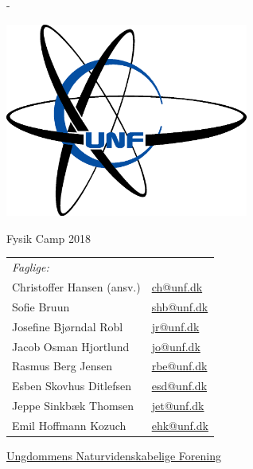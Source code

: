 \begin{titlingpage}
  \newlength{\frontpagecorrection}
  \calccentering{\frontpagecorrection}

  \begin{adjustwidth*}{\frontpagecorrection-2cm}{-\frontpagecorrection-2cm}
    
  \centering

  \vfill

  \includegraphics[width=8cm]{old/Unflogo.eps}
 
  \scshape
    
  \fontsize{24pt}{28pt}\selectfont

  \bigskip

  \vspace{0.5cm}
    
  Fysik Camp 2018\par

  \vspace{1cm}
  
  \begin{table}[h!]
    \centering
    \begin{tabular}{ll}
      \textit{Faglige:} & \\
      Christoffer Hansen (ansv.)       & \href{mailto:ch@unf.dk}{ch@unf.dk} \\
      Sofie Bruun         & \href{mailto:shbl@unf.dk}{shb@unf.dk} \\
      Josefine Bjørndal Robl           & \href{mailto:jr@unf.dk}{jr@unf.dk} \\
      Jacob Osman Hjortlund           & \href{mailto:jo@unf.dk}{jo@unf.dk} \\
      Rasmus Berg Jensen           & \href{mailto:rbe@unf.dk}{rbe@unf.dk} \\
      Esben Skovhus Ditlefsen           & \href{mailto:esd@unf.dk}{esd@unf.dk} \\
      Jeppe Sinkbæk Thomsen           & \href{mailto:jet@unf.dk}{jet@unf.dk} \\
      Emil Hoffmann Kozuch           & \href{mailto:ehk@unf.dk}{ehk@unf.dk} \\
   
    \end{tabular}
  \end{table}

  \vfill
    
  \fontsize{14pt}{18pt}\selectfont
  \href{http://www.unf.dk/}{Ungdommens Naturvidenskabelige
    Forening}\par
  \end{adjustwidth*}
\end{titlingpage}

